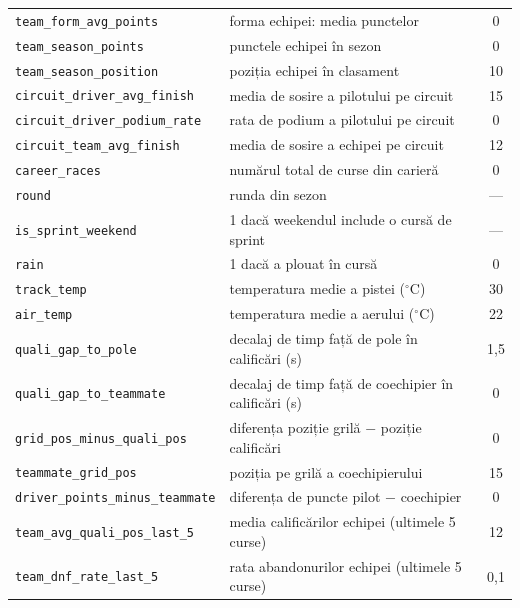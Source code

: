 \documentclass[12pt,a4paper]{report}
\begin{document}
{\begin{table}[htbp]
{\begin{tabular}{l l c}
    \texttt{team\_form\_avg\_points}    & forma echipei: media punctelor                  & 0 \\
    \texttt{team\_season\_points}       & punctele echipei în sezon                       & 0 \\
    \texttt{team\_season\_position}     & poziția echipei în clasament                    & 10 \\
    \texttt{circuit\_driver\_avg\_finish} & media de sosire a pilotului pe circuit        & 15 \\
    \texttt{circuit\_driver\_podium\_rate} & rata de podium a pilotului pe circuit        & 0 \\
    \texttt{circuit\_team\_avg\_finish} & media de sosire a echipei pe circuit            & 12 \\
    \texttt{career\_races}              & numărul total de curse din carieră              & 0 \\
    \texttt{round}                      & runda din sezon                                 & --- \\
    \texttt{is\_sprint\_weekend}        & 1 dacă weekendul include o cursă de sprint      & --- \\
    \texttt{rain}                       & 1 dacă a plouat în cursă                         & 0 \\
    \texttt{track\_temp}                & temperatura medie a pistei ($^{\circ}$C)        & 30 \\
    \texttt{air\_temp}                  & temperatura medie a aerului ($^{\circ}$C)       & 22 \\
    \midrule
    \texttt{quali\_gap\_to\_pole}       & decalaj de timp față de pole în calificări (s)  & 1,5 \\
    \texttt{quali\_gap\_to\_teammate}   & decalaj de timp față de coechipier în calificări (s) & 0 \\
    \texttt{grid\_pos\_minus\_quali\_pos} & diferența poziție grilă $-$ poziție calificări  & 0 \\
    \texttt{teammate\_grid\_pos}        & poziția pe grilă a coechipierului               & 15 \\
    \texttt{driver\_points\_minus\_teammate} & diferența de puncte pilot $-$ coechipier   & 0 \\
    \texttt{team\_avg\_quali\_pos\_last\_5} & media calificărilor echipei (ultimele 5 curse) & 12 \\
    \texttt{team\_dnf\_rate\_last\_5}   & rata abandonurilor echipei (ultimele 5 curse)   & 0,1 \\

\end{tabular}}
\end{table}}
\end{document}
